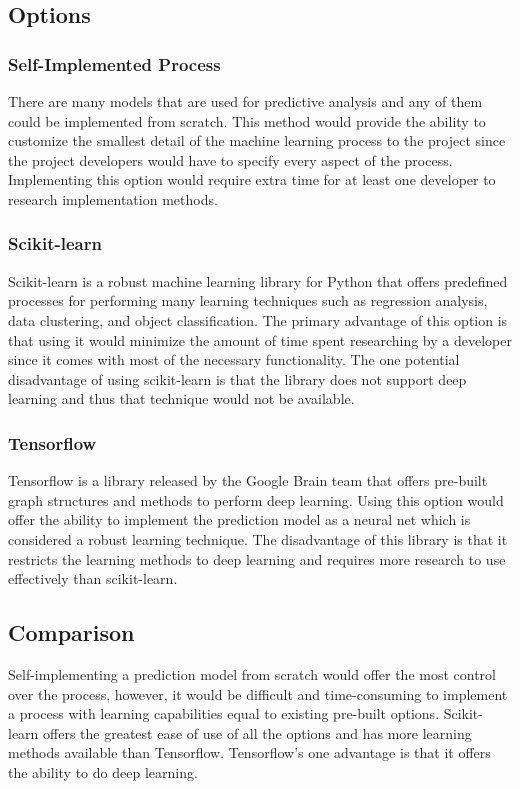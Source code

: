 \documentclass[onecolumn, draftclsnofoot,10pt, compsoc]{IEEEtran}
\begin{document}
    \subsection{Options}
        \subsubsection{Self-Implemented Process}
            There are many models that are used for predictive analysis and any of them could be implemented from scratch. 
            This method would provide the ability to customize the smallest detail of the machine learning process to the project since the project developers would have to specify every aspect of the process. 
            Implementing this option would require extra time for at least one developer to research implementation methods.
        \subsubsection{Scikit-learn}
            Scikit-learn is a robust machine learning library for Python that offers predefined processes for performing many learning techniques such as regression analysis, data clustering, and object classification\cite{ScikitLearnOrg}. 
            The primary advantage of this option is that using it would minimize the amount of time spent researching by a developer since it comes with most of the necessary functionality. 
            The one potential disadvantage of using scikit-learn is that the library does not support deep learning and thus that technique would not be available\cite{ScikitLearnDeepLearning}.
        \subsubsection{Tensorflow}
        Tensorflow is a library released by the Google Brain team that offers pre-built graph structures and methods to perform deep learning\cite{TensorflowOrg}. 
            Using this option would offer the ability to implement the prediction model as a neural net which is considered a robust learning technique. 
            The disadvantage of this library is that it restricts the learning methods to deep learning and requires more research to use effectively than scikit-learn.
    \subsection{Comparison}
        Self-implementing a prediction model from scratch would offer the most control over the process, however, it would be difficult and time-consuming to implement a process with learning capabilities equal to existing pre-built options. 
        Scikit-learn offers the greatest ease of use of all the options and has more learning methods available than Tensorflow. 
        Tensorflow's one advantage is that it offers the ability to do deep learning.
\end{document}
